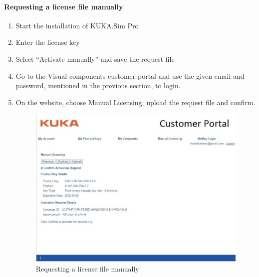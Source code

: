 			\paragraph{Requesting a license file manually}
				\begin{enumerate}
					\item Start the installation of KUKA.Sim Pro 
					\item Enter the license key
					\item Select “Activate manually” and save the request file
					\item Go to the Visual components customer portal and use the given email and password, mentioned in the previous section, to login.
					\item On the website, choose Manual Licensing, upload the request file and confirm.
                        \begin{figure}[H]
                            \centering
                            \includegraphics[width=\textwidth]{figures/simpro2}
                            \caption{Requesting a license file manually}
                            \label{fig:simpro2}
                        \end{figure}


\end{enumerate}
